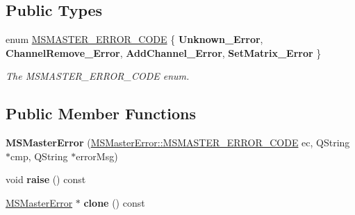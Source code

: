 \subsection*{Public Types}
\begin{DoxyCompactItemize}
\item 
enum \hyperlink{class_m_s_master_error_aa1deb878016117b72d744363b49a16e4_aa1deb878016117b72d744363b49a16e4}{M\-S\-M\-A\-S\-T\-E\-R\-\_\-\-E\-R\-R\-O\-R\-\_\-\-C\-O\-D\-E} \{ {\bfseries Unknown\-\_\-\-Error}, 
{\bfseries Channel\-Remove\-\_\-\-Error}, 
{\bfseries Add\-Channel\-\_\-\-Error}, 
{\bfseries Set\-Matrix\-\_\-\-Error}
 \}
\begin{DoxyCompactList}\small\item\em The M\-S\-M\-A\-S\-T\-E\-R\-\_\-\-E\-R\-R\-O\-R\-\_\-\-C\-O\-D\-E enum. \end{DoxyCompactList}\end{DoxyCompactItemize}
\subsection*{Public Member Functions}
\begin{DoxyCompactItemize}
\item 
\hypertarget{class_m_s_master_error_ae99de5e65ace36645a5f4979c4e91e8e_ae99de5e65ace36645a5f4979c4e91e8e}{{\bfseries M\-S\-Master\-Error} (\hyperlink{class_m_s_master_error_aa1deb878016117b72d744363b49a16e4_aa1deb878016117b72d744363b49a16e4}{M\-S\-Master\-Error\-::\-M\-S\-M\-A\-S\-T\-E\-R\-\_\-\-E\-R\-R\-O\-R\-\_\-\-C\-O\-D\-E} ec, Q\-String $\ast$cmp, Q\-String $\ast$error\-Msg)}\label{class_m_s_master_error_ae99de5e65ace36645a5f4979c4e91e8e_ae99de5e65ace36645a5f4979c4e91e8e}

\item 
\hypertarget{class_m_s_master_error_aa3f4ef6e72be82c5600cc0a2ced741be_aa3f4ef6e72be82c5600cc0a2ced741be}{void {\bfseries raise} () const }\label{class_m_s_master_error_aa3f4ef6e72be82c5600cc0a2ced741be_aa3f4ef6e72be82c5600cc0a2ced741be}

\item 
\hypertarget{class_m_s_master_error_aa217c96d2f3cc8e2d1e1fc98f7f63061_aa217c96d2f3cc8e2d1e1fc98f7f63061}{\hyperlink{class_m_s_master_error}{M\-S\-Master\-Error} $\ast$ {\bfseries clone} () const }\label{class_m_s_master_error_aa217c96d2f3cc8e2d1e1fc98f7f63061_aa217c96d2f3cc8e2d1e1fc98f7f63061}

\end{DoxyCompactItemize}
